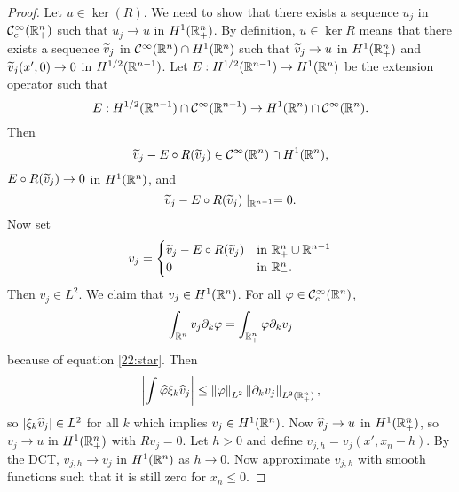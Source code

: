 \begin{proof}
  Let $u\in\ker(R)$.
  We need to show that there exists a sequence $u_j$ in $\mathcal{C}_c^\infty(\mathbb{R}_+^n)$ such that $u_j\to u$ in $H^1(\mathbb{R}_+^n)$.
  By definition, $u\in\ker R$ means that there exists a sequence $\widetilde v_j$ in $\mathcal{C}^\infty(\mathbb{R}^n) \cap H^1(\mathbb{R}^n)$ such that $\widetilde v_j\to u$ in $H^1(\mathbb{R}_+^n)$ and $\widetilde v_j(x',0) \to 0$ in $H^{1/2}(\mathbb{R}^{n-1})$.
  Let $E: H^{1/2}(\mathbb{R}^{n-1}) \to H^1(\mathbb{R}^n)$ be the extension operator such that 
  \[ E: H^{1/2}(\mathbb{R}^{n-1}) \cap \mathcal{C}^\infty(\mathbb{R}^{n-1}) \to H^1(\mathbb{R}^n) \cap \mathcal{C}^\infty(\mathbb{R}^n). \]
  Then
  \[ \widetilde v_j - E\circ R(\widetilde v_j) \in \mathcal{C}^\infty(\mathbb{R}^n) \cap H^1(\mathbb{R}^n), \]
  $E\circ R(\widetilde v_j) \to 0$ in $H^1(\mathbb{R}^n)$, and
  \begin{equation}
    \widetilde v_j - E\circ R(\widetilde v_j) \mid_{\mathbb{R}^{n-1}}=0.
    \label{22:star}
  \end{equation}
  Now set
  \begin{equation*}
    v_j=
    \begin{cases}
      \widetilde v_j-E\circ R(\widetilde v_j) &\text{in } \mathbb{R}_+^n \cup \mathbb{R}^{n-1} \\
      0 &\text{in } \mathbb{R}_-^n.
    \end{cases}
  \end{equation*}
  Then $v_j\in L^2$.
  We claim that $v_j\in H^1(\mathbb{R}^n)$.
  For all $\varphi\in\mathcal{C}_c^\infty(\mathbb{R}^n)$,
  \[ \int_{\mathbb{R}^n}v_j\partial_k\varphi = \int_{\mathbb{R}_+^n}\varphi\partial_kv_j \]
  because of equation \ref{22:star}.
  Then
  \[ \left\lvert \int\widehat{\varphi}\xi_k\widehat v_j \right\rvert \leq \left\lVert \varphi \right\rVert_{L^2}\left\lVert \partial_kv_j \right\rVert_{L^2(\mathbb{R}_+^n)}, \]
  so $|\xi_k\widehat v_j|\in L^2$ for all $k$ which implies $v_j\in H^1(\mathbb{R}^n)$.
  Now $\widehat v_j\to u$ in $H^1(\mathbb{R}_+^n)$, so $v_j \to u$ in $H^1(\mathbb{R}_+^n)$ with $Rv_j=0$.
  Let $h>0$ and define $v_{j,h}=v_j(x',x_n-h)$.
  By the DCT, $v_{j,h}\to v_j$ in $H^1(\mathbb{R}^n)$ as $h\to0$.
  Now approximate $v_{j,h}$ with smooth functions such that it is still zero for $x_n\leq0$.
\end{proof}
